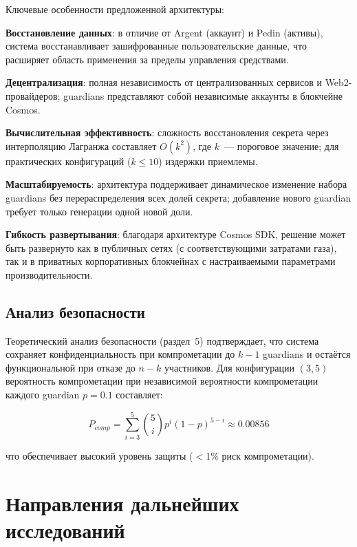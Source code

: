 \documentclass[12pt]{a&t}
\begin{document}
Ключевые особенности предложенной архитектуры:

\begin{itemlist}
\item
\textbf{Восстановление данных}: в отличие от Argent (аккаунт) и Pedin (активы), система восстанавливает зашифрованные пользовательские данные, что расширяет область применения за пределы управления средствами.

\item
\textbf{Децентрализация}: полная независимость от централизованных сервисов и Web2-провайдеров; guardians представляют собой независимые аккаунты в блокчейне Cosmos.

\item
\textbf{Вычислительная эффективность}: сложность восстановления секрета через интерполяцию Лагранжа составляет $O(k^2)$, где $k$~--- пороговое значение; для практических конфигураций ($k \leq 10$) издержки приемлемы.

\item
\textbf{Масштабируемость}: архитектура поддерживает динамическое изменение набора guardians без перераспределения всех долей секрета; добавление нового guardian требует только генерации одной новой доли.

\item
\textbf{Гибкость развертывания}: благодаря архитектуре Cosmos SDK, решение может быть развернуто как в публичных сетях (с соответствующими затратами газа), так и в приватных корпоративных блокчейнах с настраиваемыми параметрами производительности.
\end{itemlist}

\subsection{Анализ безопасности}

Теоретический анализ безопасности (раздел~5) подтверждает, что система сохраняет конфиденциальность при компрометации до $k-1$ guardians и остаётся функциональной при отказе до $n-k$ участников. Для конфигурации $(3,5)$ вероятность компрометации при независимой вероятности компрометации каждого guardian $p=0.1$ составляет:

$$P_{comp} = \sum_{i=3}^{5} \binom{5}{i} p^i (1-p)^{5-i} \approx 0.00856$$

что обеспечивает высокий уровень защиты ($<$1\% риск компрометации).

\section{Направления дальнейших исследований}
\end{document}
